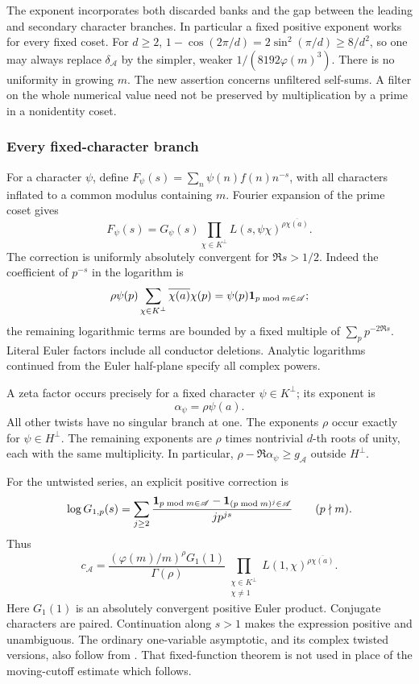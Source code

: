 The exponent incorporates both discarded banks and the gap between
the leading and secondary character branches. In particular a fixed
positive exponent works for every fixed coset. For \(d\ge2\),
\(1-\cos(2\pi/d)=2\sin^2(\pi/d)\ge8/d^2\), so one may always
replace \(\delta_{\mathscr A}\) by the simpler, weaker
\(1/(8192\varphi(m)^3)\). There is no uniformity in growing \(m\).
The new assertion concerns unfiltered self-sums. A filter on the
whole numerical value need not be preserved by multiplication by a
prime in a nonidentity coset.

\subsubsection{Every fixed-character branch}

For a character \(\psi\), define
\(F_\psi(s)=\sum_n\psi(n)f(n)n^{-s}\), with all characters inflated
to a common modulus containing \(m\). Fourier expansion of the prime
coset gives
\begin{equation}\label{eq:coset-character-factorization}
 F_\psi(s)=G_\psi(s)
        \prod_{\chi\in K^\perp}L(s,\psi\chi)^{\rho\overline{\chi(a)}}.
\end{equation}
The correction is uniformly absolutely convergent for \(\Re s>1/2\).
Indeed the coefficient of \(p^{-s}\) in the logarithm is
\[
 \rho\psi(p)\sum_{\chi\in K^\perp}\overline{\chi(a)}\chi(p)
                =\psi(p)\mathbf 1_{p\bmod m\in\mathscr A};
\]
the remaining logarithmic terms are bounded by a fixed multiple of
\(\sum_p p^{-2\Re s}\). Literal Euler factors include all conductor
deletions. Analytic logarithms continued from the Euler half-plane
specify all complex powers.

A zeta factor occurs precisely for a fixed character
\(\psi\in K^\perp\); its exponent is
\begin{equation}\label{eq:coset-exponents}
                       \alpha_\psi=\rho\psi(a).
\end{equation}
All other twists have no singular branch at one. The exponents
\(\rho\) occur exactly for \(\psi\in H^\perp\). The remaining
exponents are \(\rho\) times nontrivial \(d\)-th roots of unity,
each with the same multiplicity. In particular,
\(\rho-\Re\alpha_\psi\ge g_{\mathscr A}\) outside \(H^\perp\).

For the untwisted series, an explicit positive correction is
\[
 \log G_{1,p}(s)=\sum_{j\ge2}
 \frac{\mathbf 1_{p\bmod m\in\mathscr A}-\mathbf 1_{(p\bmod m)^j\in\mathscr A}}{j p^{js}}
 \qquad(p\nmid m).
\]
Thus
\begin{equation}\label{eq:coset-constant}
 c_{\mathscr A}=\frac{(\varphi(m)/m)^\rho G_1(1)}{\Gamma(\rho)}
        \prod_{\substack{\chi\in K^\perp\\\chi\ne1}}
                     L(1,\chi)^{\rho\overline{\chi(a)}}.
\end{equation}
Here \(G_1(1)\) is an absolutely convergent positive Euler product.
Conjugate characters are paired. Continuation along \(s>1\) makes
the expression positive and unambiguous. The ordinary one-variable
asymptotic, and its complex twisted versions, also follow from
\cite[Theorem 1.2 and (1.9)--(1.10)]{delabretechetenenbaum}.
That fixed-function theorem is not used in place of the moving-cutoff
estimate which follows.

